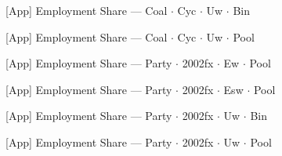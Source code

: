 \documentclass[aspectratio=169,10pt]{beamer}
\newcommand{\tabledir}{../tables/firm}
\begin{document}
\begin{frame}[t,shrink=5]{[App] Employment Share --- Coal $\cdot$ Cyc $\cdot$ Uw $\cdot$ Bin}
\begin{center}\footnotesize

\end{center}
\end{frame}

\begin{frame}[t,shrink=5]{[App] Employment Share --- Coal $\cdot$ Cyc $\cdot$ Uw $\cdot$ Pool}
\begin{center}\footnotesize

\end{center}
\end{frame}

\begin{frame}[t,shrink=5]{[App] Employment Share --- Party $\cdot$ 2002fx $\cdot$ Ew $\cdot$ Pool}
\begin{center}\footnotesize

\end{center}
\end{frame}

\begin{frame}[t,shrink=5]{[App] Employment Share --- Party $\cdot$ 2002fx $\cdot$ Esw $\cdot$ Pool}
\begin{center}\footnotesize

\end{center}
\end{frame}

\begin{frame}[t,shrink=5]{[App] Employment Share --- Party $\cdot$ 2002fx $\cdot$ Uw $\cdot$ Bin}
\begin{center}\footnotesize

\end{center}
\end{frame}

\begin{frame}[t,shrink=5]{[App] Employment Share --- Party $\cdot$ 2002fx $\cdot$ Uw $\cdot$ Pool}
\begin{center}\footnotesize

\end{center}
\end{frame}
\end{document}
